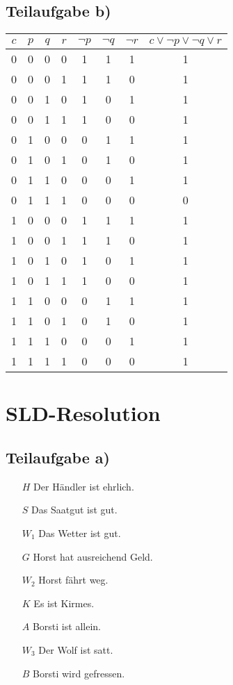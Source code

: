 \documentclass{article}
\begin{document}
\subsection{Teilaufgabe b)}

\begin{tabular}{|c|c|c|c|c|c|c|c|}
\hline
$c$ & $p$ & $q$ & $r$ & $\neg p$ & $\neg q$ & $\neg r$ & $c \vee \neg p \vee \neg q \vee r$\\
\hline
0 & 0 & 0 & 0 & 1 & 1 & 1 & 1 \\
0 & 0 & 0 & 1 & 1 & 1 & 0 & 1 \\
0 & 0 & 1 & 0 & 1 & 0 & 1 & 1 \\
0 & 0 & 1 & 1 & 1 & 0 & 0 & 1 \\
0 & 1 & 0 & 0 & 0 & 1 & 1 & 1 \\
0 & 1 & 0 & 1 & 0 & 1 & 0 & 1 \\
0 & 1 & 1 & 0 & 0 & 0 & 1 & 1 \\
0 & 1 & 1 & 1 & 0 & 0 & 0 & 0 \\
1 & 0 & 0 & 0 & 1 & 1 & 1 & 1 \\
1 & 0 & 0 & 1 & 1 & 1 & 0 & 1 \\
1 & 0 & 1 & 0 & 1 & 0 & 1 & 1 \\
1 & 0 & 1 & 1 & 1 & 0 & 0 & 1 \\
1 & 1 & 0 & 0 & 0 & 1 & 1 & 1 \\
1 & 1 & 0 & 1 & 0 & 1 & 0 & 1 \\
1 & 1 & 1 & 0 & 0 & 0 & 1 & 1 \\
1 & 1 & 1 & 1 & 0 & 0 & 0 & 1 \\
\hline
\end{tabular}

\section{SLD-Resolution}

\subsection{Teilaufgabe a)}

\begin{itemize}
\item[\textbf{$H$}] Der Händler ist ehrlich.
\item[\textbf{$S$}] Das Saatgut ist gut.
\item[\textbf{$W_1$}] Das Wetter ist gut.
\item[\textbf{$G$}] Horst hat ausreichend Geld.
\item[\textbf{$W_2$}] Horst fährt weg.
\item[\textbf{$K$}] Es ist Kirmes.
\item[\textbf{$A$}] Borsti ist allein.
\item[\textbf{$W_3$}] Der Wolf ist satt.
\item[\textbf{$B$}] Borsti wird gefressen.
\end{itemize}
\end{document}
